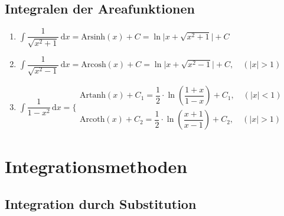 \subsection{Integralen der Areafunktionen}
\begin{enumerate}[$(a)$]
\item $\displaystyle \int \dfrac{1}{\sqrt{x^2+1}}\,\text{d}x=\text{Arsinh}\left(x\right)+C=\ln\Big\vert x+\sqrt{x^2+1} \Big\vert+C$
\item $\displaystyle \int \dfrac{1}{\sqrt{x^2-1}}\,\text{d}x=\text{Arcosh}\left(x\right)+C=\ln\Big\vert x+\sqrt{x^2-1} \Big\vert+C,\quad \left(\Big\vert x\Big\vert>1\right)$
\item $\displaystyle \int \dfrac{1}{1-x^2}\,\text{d}x=\Bigg\{\begin{matrix}\text{Artanh}\left(x\right)+C_1=\dfrac{1}{2}\cdot \ln\left(\dfrac{1+x}{1-x}\right)+C_1,\quad \left(\Big\vert x\Big\vert<1\right)\\\text{Arcoth}\left(x\right)+C_2=\dfrac{1}{2}\cdot \ln\left(\dfrac{x+1}{x-1}\right)+C_2,\quad \left(\Big\vert x\Big\vert>1\right)\end{matrix}$
\end{enumerate}
\section{Integrationsmethoden}
\subsection{Integration durch Substitution}
